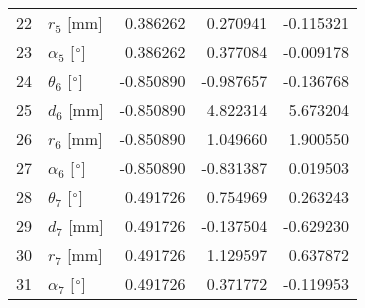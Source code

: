 \documentclass{standalone}%
\begin{document}
\begin{tabular}{llrrr}
22 &              $r_{5}$ [mm] &  0.386262 &   0.270941 &  -0.115321 \\
23 &  $\alpha_{5}$ [$\degree$] &  0.386262 &   0.377084 &  -0.009178 \\
24 &  $\theta_{6}$ [$\degree$] & -0.850890 &  -0.987657 &  -0.136768 \\
25 &              $d_{6}$ [mm] & -0.850890 &   4.822314 &   5.673204 \\
26 &              $r_{6}$ [mm] & -0.850890 &   1.049660 &   1.900550 \\
27 &  $\alpha_{6}$ [$\degree$] & -0.850890 &  -0.831387 &   0.019503 \\
28 &  $\theta_{7}$ [$\degree$] &  0.491726 &   0.754969 &   0.263243 \\
29 &              $d_{7}$ [mm] &  0.491726 &  -0.137504 &  -0.629230 \\
30 &              $r_{7}$ [mm] &  0.491726 &   1.129597 &   0.637872 \\
31 &  $\alpha_{7}$ [$\degree$] &  0.491726 &   0.371772 &  -0.119953 \\
\bottomrule
\end{tabular}
%
\end{document}
